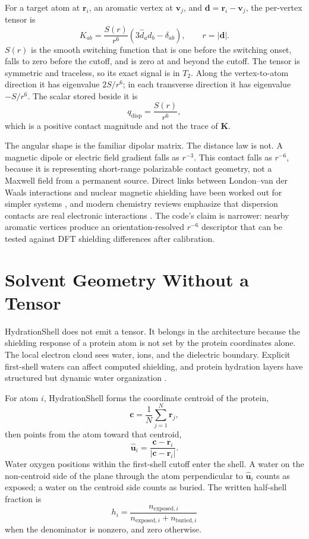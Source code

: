 \documentclass[11pt]{article}
\begin{document}
For a target atom at \(\bm r_i\), an aromatic vertex at \(\bm v_j\), and
\(\bm d=\bm r_i-\bm v_j\), the per-vertex tensor is
\[
  K_{ab}
  =
  \frac{S(r)}{r^6}
  \left(3\hat d_a\hat d_b-\delta_{ab}\right),
  \qquad
  r=|\bm d|.
\]
\(S(r)\) is the smooth switching function that is one before the switching
onset, falls to zero before the cutoff, and is zero at and beyond the cutoff.
The tensor is symmetric and traceless, so its exact signal is in \(T_2\). Along
the vertex-to-atom direction it has eigenvalue \(2S/r^6\); in each transverse
direction it has eigenvalue \(-S/r^6\). The scalar stored beside it is
\[
  q_{\mathrm{disp}}=\frac{S(r)}{r^6},
\]
which is a positive contact magnitude and not the trace of \(\bm K\).

The angular shape is the familiar dipolar matrix. The distance law is not. A
magnetic dipole or electric field gradient falls as \(r^{-3}\). This contact
falls as \(r^{-6}\), because it is representing short-range polarizable contact
geometry, not a Maxwell field from a permanent source. Direct links between
London--van der Waals interactions and nuclear magnetic shielding have been
worked out for simpler systems \cite{kromhout1969}, and modern chemistry
reviews emphasize that dispersion contacts are real electronic interactions
\cite{wagner2015}. The code's claim is narrower: nearby aromatic vertices
produce an orientation-resolved \(r^{-6}\) descriptor that can be tested
against DFT shielding differences after calibration.

\section{Solvent Geometry Without a Tensor}

HydrationShell does not emit a tensor. It belongs in the architecture because
the shielding response of a protein atom is not set by the protein coordinates
alone. The local electron cloud sees water, ions, and the dielectric boundary.
Explicit first-shell waters can affect computed shielding, and protein
hydration layers have structured but dynamic water organization
\cite{nakasako2004,halle2004,martin2015}.

For atom \(i\), HydrationShell forms the coordinate centroid of the protein,
\[
  \bm c=\frac{1}{N}\sum_{j=1}^N \bm r_j,
\]
then points from the atom toward that centroid,
\[
  \hat{\bm u}_i=\frac{\bm c-\bm r_i}{|\bm c-\bm r_i|}.
\]
Water oxygen positions within the first-shell cutoff enter the shell. A water
on the non-centroid side of the plane through the atom perpendicular to
\(\hat{\bm u}_i\) counts as exposed; a water on the centroid side counts as
buried. The written half-shell fraction is
\[
  h_i=
  \frac{n_{\mathrm{exposed},i}}
       {n_{\mathrm{exposed},i}+n_{\mathrm{buried},i}}
\]
when the denominator is nonzero, and zero otherwise.
\end{document}
